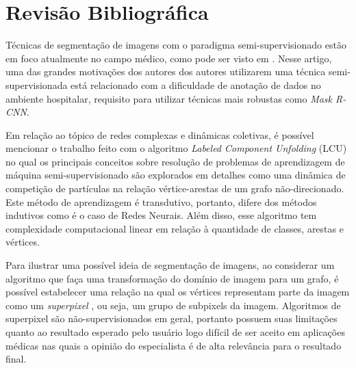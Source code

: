 \chapter{Revisão Bibliográfica}\label{cap:revisao-bibliografica}

Técnicas de segmentação de imagens com o paradigma semi-supervisionado
estão em foco atualmente no campo médico, como pode ser visto em
\cite{LuoSemiSupervised2021}. Nesse artigo, uma das grandes motivações
dos autores dos autores utilizarem uma técnica semi-supervisionada
está relacionado com a dificuldade de anotação de dados no ambiente
hospitalar, requisito para utilizar técnicas mais robustas como
\textit{Mask R-CNN}.

Em relação ao tópico de redes complexas e dinâmicas coletivas, é
possível mencionar o trabalho feito com o algoritmo \textit{Labeled
Component Unfolding} (LCU) \cite{VerriNetworkUnfoldingMap2018} no
qual os principais conceitos sobre resolução de problemas de
aprendizagem de máquina semi-supervisionado são explorados em detalhes
como uma dinâmica de competição de partículas na relação
vértice-arestas de um grafo não-direcionado. Este método de
aprendizagem é transdutivo, portanto, difere dos métodos indutivos
como é o caso de Redes Neurais. Além disso, esse algoritmo tem
complexidade computacional linear em relação à quantidade de classes, arestas e
vértices.

Para ilustrar uma possível ideia de segmentação de imagens, ao
considerar um algoritmo que faça uma transformação do domínio de imagem para um
grafo, é possível estabelecer uma relação na qual os vértices representam
parte da imagem como um \textit{superpixel}
\cite{SuperpixelSurvey2020}, ou seja, um grupo de subpixels da
imagem. Algoritmos de superpixel são não-supervisionados em geral,
portanto possuem suas limitações quanto ao resultado esperado pelo
usuário \textendash \hfill logo difícil de ser aceito em aplicações médicas
nas quais a opinião do especialista é de alta relevância para o
resultado final.

\begin{figure}[!h]
        \captionsetup{width=8cm}
		\centering
\end{figure}



